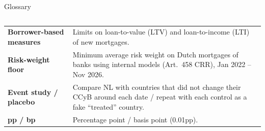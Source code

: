\documentclass[aspectratio=169,11pt,t]{beamer}
\gdef\theqtag{}
\newcommand{\qtag}[1]{\gdef\theqtag{#1}}
\begin{document}
\begin{frame}{Glossary}
\begin{columns}[T,onlytextwidth]
\begin{tabularx}{\linewidth}{@{}>{\raggedright\arraybackslash\bfseries}p{2.3cm}X@{}}
      Borrower-based measures & Limits on loan-to-value (LTV) and loan-to-income (LTI) of new mortgages. \\
      Risk-weight floor & Minimum average risk weight on Dutch mortgages of banks using internal models (Art.\ 458 CRR), Jan 2022 – Nov 2026. \\
      Event study / placebo & Compare NL with countries that did not change their CCyB around each date / repeat with each control as a fake “treated” country. \\
      pp / bp & Percentage point / basis point (0.01pp). \\
      \bottomrule
    \end{tabularx}
  \end{columns}
\end{frame}

\qtag{Appendix}
\end{document}
